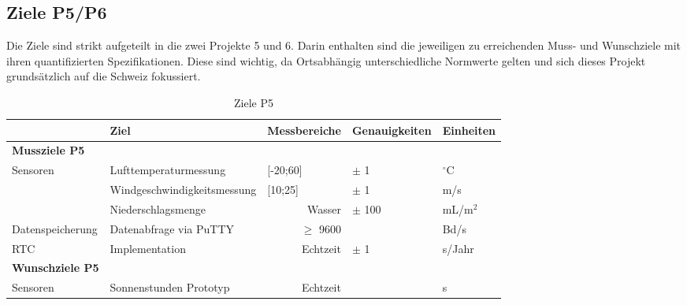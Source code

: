 \begin{landscape}
\section{Ziele P5/P6}
Die Ziele sind strikt aufgeteilt in die zwei Projekte 5 und 6. Darin enthalten sind die jeweiligen zu erreichenden Muss- und Wunschziele mit ihren quantifizierten Spezifikationen. Diese sind wichtig, da Ortsabhängig unterschiedliche Normwerte gelten und sich dieses Projekt grundsätzlich auf die Schweiz fokussiert.\\
\begin{table}[htbp]
  \centering
  \caption{Ziele P5}
    \begin{tabular}{r|l|r|l|l}
          & \textbf{Ziel} & \multicolumn{1}{l|}{\textbf{Messbereiche}} & \textbf{Genauigkeiten} & \textbf{Einheiten} \\
    \toprule
    \multicolumn{1}{l}{\textbf{Mussziele P5}} & \multicolumn{1}{r}{} & \multicolumn{1}{r}{} & \multicolumn{1}{r}{} &  \\
    \toprule
    \multicolumn{1}{l|}{Sensoren} & Lufttemperaturmessung & \multicolumn{1}{l|}{[-20;60]} & $\pm$ 1 & $^\circ$C \\
\cline{2-5}          & Windgeschwindigkeitsmessung & \multicolumn{1}{l|}{[10;25]} & $\pm$ 1   & m/s \\
\cline{2-5} & Niederschlagsmenge &   Wasser    & $\pm$ 100 & mL/m$^2$ \\
    \hline
    \multicolumn{1}{l|}{Datenspeicherung} & Datenabfrage via PuTTY &   $\geq$ 9600    &       &  Bd/s\\
    \hline
    \multicolumn{1}{l|}{RTC} & Implementation &   Echtzeit    & $\pm$ 1   & s/Jahr \\
\bottomrule
\multicolumn{1}{l}{\textbf{Wunschziele P5}} & \multicolumn{1}{l}{} & \multicolumn{1}{l}{} & \multicolumn{1}{l}{} &  \\
    \toprule
    \multicolumn{1}{l|}{Sensoren} & Sonnenstunden Prototyp &   Echtzeit    &       & s \\
    \bottomrule
    \end{tabular}%
  \label{tab:ZieleP5}%
\end{table}%


\end{landscape}

